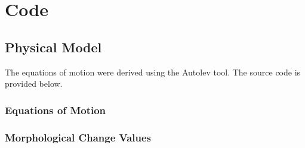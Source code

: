 \documentclass[a4paper,11pt]{report}
\begin{document}
\clearpage
{}
{}



\appendix

%





\chapter{Code}
\label{app:code}

\section{Physical Model} \label{app:code:physmod}

The equations of motion were derived using the Autolev
tool\cite{autolev}.  The source code is provided below.

% 
\lstset{basicstyle=\scriptsize, stepnumber=9, caption=frog.al, numbers=left}


\subsection{Equations of Motion} \label{physeqs-sec}

\lstset{language=Mathematica, basicstyle=\scriptsize, stepnumber=9, caption=frog\_eqns.m, numbers=left}
 

\subsection{Morphological Change Values} \label{morph-regiment-values}



\end{document}

